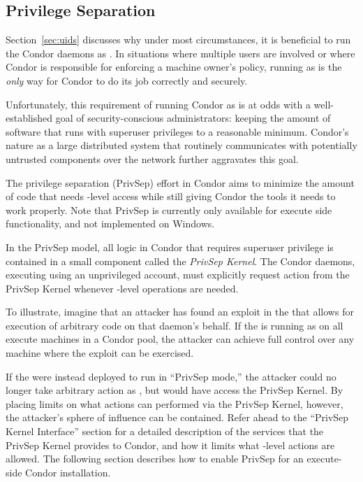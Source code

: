 \subsection{\label{sec:PrivSep}Privilege Separation}

Section~\ref{sec:uids} discusses why under most circumstances, it is
beneficial to run the Condor daemons as . In situations
where multiple users are involved or where Condor is responsible for
enforcing a machine owner's policy, running as  is the 
\emph{only} way for Condor to do its job correctly and securely.

Unfortunately, this requirement of running Condor as  is
at odds with a well-established goal of security-conscious
administrators: keeping the amount of software that runs with
superuser privileges to a reasonable minimum. Condor's nature as a
large distributed system that routinely communicates with potentially
untrusted components over the network further aggravates this goal.

The privilege separation (PrivSep) effort in Condor aims to minimize
the amount of code that needs -level access while still
giving Condor the tools it needs to work properly. Note that PrivSep
is currently only available for execute side functionality, and not
implemented on Windows.

In the PrivSep model, all logic in Condor that requires superuser
privilege is contained in a small component called the \emph{PrivSep
Kernel}. The Condor daemons, executing using an unprivileged account,
must explicitly request action from the PrivSep Kernel whenever
-level operations are needed.

To illustrate, imagine that an attacker has found an exploit in the
 that allows for execution of arbitrary code on that
daemon's behalf. If the  is running as  on
all execute machines in a Condor pool, the attacker can achieve full
control over any machine where the exploit can be exercised.

If the  were instead deployed to run in ``PrivSep
mode,'' the attacker could no longer take arbitrary action as
, but would have access the PrivSep Kernel. By placing
limits on what actions can performed via the PrivSep Kernel, however,
the attacker's sphere of influence can be contained. Refer ahead to
the ``PrivSep Kernel Interface'' section for a detailed description of
the services that the PrivSep Kernel provides to Condor, and how it
limits what -level actions are allowed. The following
section describes how to enable PrivSep for an execute-side Condor
installation.

